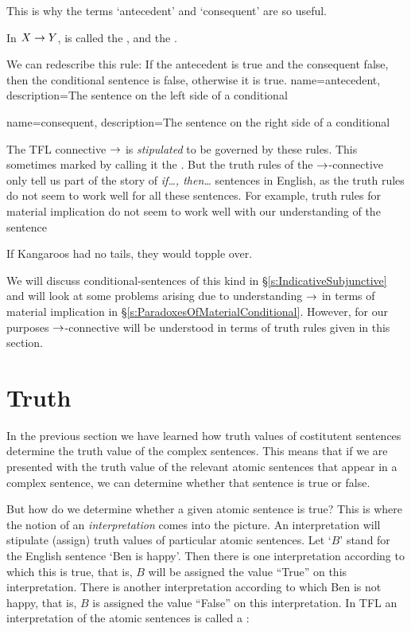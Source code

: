This is why the terms `antecedent' and `consequent' are so useful.  \begin{highlighted}
In $X\rightarrow Y$, \metaX is called the , and \metaY the .
\end{highlighted}
We can redescribe this rule:
If the antecedent is true and the consequent false, then the conditional sentence is false, otherwise it is true.
{
name=antecedent,
description={The sentence on the left side of a \gls{conditional}}
}


{
name=consequent,
description={The sentence on the right side of a \gls{conditional}}
}

The TFL connective $\rightarrow$ is \emph{stipulated} to be governed by these rules. This sometimes marked by calling it the . But the truth rules of the $\rightarrow$-connective only tell us part of the story of \emph{if\ldots, then\ldots} sentences in English, as the truth rules do not seem to work well for all these sentences. For example, truth rules for material implication do not seem to work well with our understanding of the sentence
\begin{earg}
\item[\ex{kangaroo}] If Kangaroos had no tails, they would topple over.
\end{earg}
We will discuss conditional-sentences of this kind in \S\ref{s:IndicativeSubjunctive} and will look at some problems arising due to understanding $\rightarrow$ in terms of material implication in \S\ref{s:ParadoxesOfMaterialConditional}. However, for our purposes $\rightarrow$-connective will be understood in terms of truth rules given in this section.


\section{Truth}
In the previous section we have learned how truth values of costitutent sentences determine the truth value of the complex sentences. This means that if we are presented with the truth value of the relevant atomic sentences that appear in a complex sentence, we can determine whether that sentence is true or false.

But how do we determine whether a given atomic sentence is true? This is where the notion of an \emph{interpretation} comes into the picture. An interpretation will stipulate (assign) truth values of particular atomic sentences. Let `$B$' stand for the English sentence `Ben is happy'. Then there is one interpretation according to which this is true, that is, $B$ will be assigned the value ``True'' on this interpretation. There is another interpretation according to which Ben is not happy, that is, $B$ is assigned the value ``False'' on this interpretation. In TFL an interpretation of the atomic sentences is called a :

